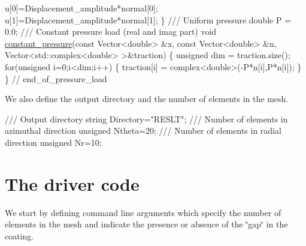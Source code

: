 \begin{DoxyCodeInclude}
  u[0]=Displacement\_amplitude*normal[0];
  u[1]=Displacement\_amplitude*normal[1];
 \}
\textcolor{comment}{}
\textcolor{comment}{ /// Uniform pressure}
\textcolor{comment}{} \textcolor{keywordtype}{double} P = 0.0;
\textcolor{comment}{}
\textcolor{comment}{ /// Constant pressure load (real and imag part)}
\textcolor{comment}{} \textcolor{keywordtype}{void} \hyperlink{namespaceGlobal__Parameters_a8363ab9f8687e9f7802f801f6dcab6e6}{constant\_pressure}(\textcolor{keyword}{const} Vector<double> &x,
                        \textcolor{keyword}{const} Vector<double> &n, 
                        Vector<std::complex<double> >&traction)
 \{
  \textcolor{keywordtype}{unsigned} dim = traction.size();
  \textcolor{keywordflow}{for}(\textcolor{keywordtype}{unsigned} i=0;i<dim;i++)
   \{
    traction[i] = complex<double>(-P*n[i],P*n[i]);
   \}
 \} \textcolor{comment}{// end\_of\_pressure\_load}

\end{DoxyCodeInclude}


We also define the output directory and the number of elements in the mesh.


\begin{DoxyCodeInclude}
 \textcolor{comment}{/// Output directory}
 \textcolor{keywordtype}{string} Directory=\textcolor{stringliteral}{"RESLT"};
 \textcolor{comment}{}
\textcolor{comment}{ /// Number of elements in azimuthal direction }
\textcolor{comment}{} \textcolor{keywordtype}{unsigned} Ntheta=20;
\textcolor{comment}{}
\textcolor{comment}{ /// Number of elements in radial direction }
\textcolor{comment}{} \textcolor{keywordtype}{unsigned} Nr=10;

\end{DoxyCodeInclude}




 

\hypertarget{index_main}{}\section{The driver code}\label{index_main}
We start by defining command line arguments which specify the number of elements in the mesh and indicate the presence or absence of the \char`\"{}gap\char`\"{} in the coating.

